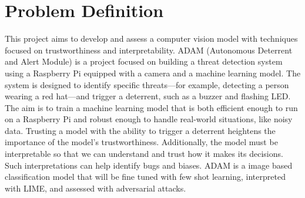 \section{Problem Definition}
This project aims to develop and assess a computer vision model with techniques focused on trustworthiness and interpretability.
ADAM (Autonomous Deterrent and Alert Module) is a project focused on building a threat detection system using a Raspberry Pi equipped with a camera and a machine learning model.
 The system is designed to identify specific threats—for example, detecting a person wearing a red hat—and trigger a deterrent, such as a buzzer and flashing LED.
The aim is to train a machine learning model that is both efficient enough to run on a Raspberry Pi and robust enough to handle real-world situations, like noisy data. 
Trusting a model with the ability to trigger a deterrent heightens the importance of the model's trustworthiness.
Additionally, the model must be interpretable so that we can understand and trust how it makes its decisions.
Such interpretations can help identify bugs and biases.
ADAM is a image based classification model that will be fine tuned with few shot learning, interpreted with LIME, and assessed with adversarial attacks.